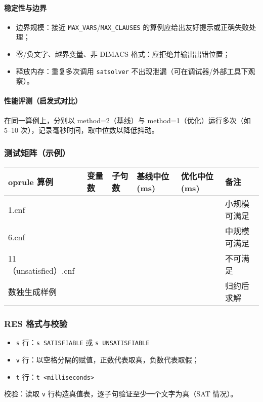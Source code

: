 \documentclass[UTF8]{ctexart}
\begin{document}
\paragraph{稳定性与边界}
\begin{itemize}
  \item 边界规模：接近 \texttt{MAX\_VARS}/\texttt{MAX\_CLAUSES} 的算例应给出友好提示或正确失败处理；
  \item 零/负文字、越界变量、非 DIMACS 格式：应拒绝并输出出错位置；
  \item 释放内存：重复多次调用 \texttt{satsolver} 不出现泄漏（可在调试器/外部工具下观察）。
\end{itemize}

\paragraph{性能评测（启发式对比）}
在同一算例上，分别以 method=2（基线）与 method=1（优化）运行多次（如 5–10 次），记录毫秒时间，取中位数以降低抖动。

\subsubsection*{测试矩阵（示例）}
\begin{longtable}{p{3cm}p{2cm}p{2cm}p{2cm}p{2cm}p{3cm}}
	oprule
算例 & 变量数 & 子句数 & 基线中位(ms) & 优化中位(ms) & 备注 \\
\midrule
1.cnf &  &  &  &  & 小规模可满足 \\
6.cnf &  &  &  &  & 中规模可满足 \\
11（unsatisfied）.cnf &  &  &  &  & 不可满足 \\
数独生成样例 &  &  &  &  & 归约后求解 \\
\bottomrule
\end{longtable}

\subsubsection*{RES 格式与校验}
\begin{itemize}
  \item \texttt{s} 行：\texttt{s SATISFIABLE} 或 \texttt{s UNSATISFIABLE}
  \item \texttt{v} 行：以空格分隔的赋值，正数代表取真，负数代表取假；
  \item \texttt{t} 行：\texttt{t <milliseconds>}
\end{itemize}
校验：读取 \texttt{v} 行构造真值表，逐子句验证至少一个文字为真（SAT 情况）。
\end{document}

